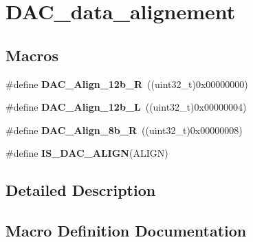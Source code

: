 \hypertarget{group___d_a_c__data__alignement}{}\section{D\+A\+C\+\_\+data\+\_\+alignement}
\label{group___d_a_c__data__alignement}
\subsection*{Macros}
\begin{DoxyCompactItemize}
\item 
\#define {\bfseries D\+A\+C\+\_\+\+Align\+\_\+12b\+\_\+R}~((uint32\+\_\+t)0x00000000)\hypertarget{group___d_a_c__data__alignement_ga0f2a6fc71aaf90a27b0caf1bd06e73f2}{}\label{group___d_a_c__data__alignement_ga0f2a6fc71aaf90a27b0caf1bd06e73f2}

\item 
\#define {\bfseries D\+A\+C\+\_\+\+Align\+\_\+12b\+\_\+L}~((uint32\+\_\+t)0x00000004)\hypertarget{group___d_a_c__data__alignement_gaf3a46d37092eac0d4c9c1039e68208d4}{}\label{group___d_a_c__data__alignement_gaf3a46d37092eac0d4c9c1039e68208d4}

\item 
\#define {\bfseries D\+A\+C\+\_\+\+Align\+\_\+8b\+\_\+R}~((uint32\+\_\+t)0x00000008)\hypertarget{group___d_a_c__data__alignement_gaa633fbcf85e97e12c4894eaed530dd8f}{}\label{group___d_a_c__data__alignement_gaa633fbcf85e97e12c4894eaed530dd8f}

\item 
\#define {\bfseries I\+S\+\_\+\+D\+A\+C\+\_\+\+A\+L\+I\+GN}(A\+L\+I\+GN)
\end{DoxyCompactItemize}


\subsection{Detailed Description}


\subsection{Macro Definition Documentation}
